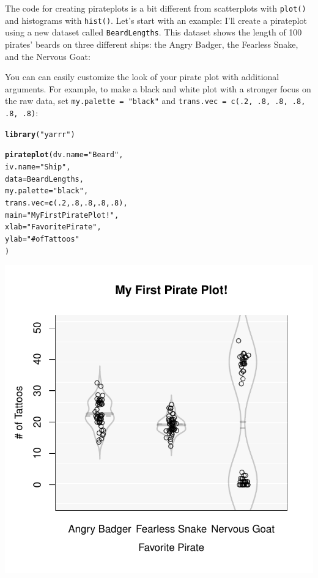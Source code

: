 \documentclass{tufte-book}\usepackage[]{graphicx}\usepackage[]{color}
\makeatletter
\def\maxwidth{ %
  \ifdim\Gin@nat@width>\linewidth
    \linewidth
  \else
    \Gin@nat@width
  \fi
}
\newcommand{\hlnum}[1]{\textcolor[rgb]{0.686,0.059,0.569}{#1}}%
\newcommand{\hlstr}[1]{\textcolor[rgb]{0.192,0.494,0.8}{#1}}%
\newcommand{\hlstd}[1]{\textcolor[rgb]{0.345,0.345,0.345}{#1}}%
\newcommand{\hlkwc}[1]{\textcolor[rgb]{0.333,0.667,0.333}{#1}}%
\newcommand{\hlkwd}[1]{\textcolor[rgb]{0.737,0.353,0.396}{\textbf{#1}}}%
\newenvironment{kframe}{%
 \def\at@end@of@kframe{}%
 \ifinner\ifhmode%
  \def\at@end@of@kframe{\end{minipage}}%
  \begin{minipage}{\columnwidth}%
 \fi\fi%
 \def\FrameCommand##1{\hskip\@totalleftmargin \hskip-\fboxsep
 \colorbox{shadecolor}{##1}\hskip-\fboxsep
     \hskip-\linewidth \hskip-\@totalleftmargin \hskip\columnwidth}%
 \MakeFramed {\advance\hsize-\width
   \@totalleftmargin\z@ \linewidth\hsize
   \@setminipage}}%
 {\par\unskip\endMakeFramed%
 \at@end@of@kframe}
\newenvironment{knitrout}{}{} %
\makeatother
\begin{document}
The code for creating pirateplots is a bit different from scatterplots with \texttt{plot()} and histograms with \texttt{hist()}. Let's start with an example: I'll create a pirateplot using a new dataset called \texttt{BeardLengths}. This dataset shows the length of 100 pirates' beards on three different ships: the Angry Badger, the Fearless Snake, and the Nervous Goat:

\begin{marginfigure}

You can can easily customize the look of your pirate plot with additional arguments. For example, to make a black and white plot with a stronger focus on the raw data, set \texttt{my.palette = "black"} and \texttt{trans.vec = c(.2, .8, .8, .8, .8, .8)}:

\begin{footnotesize}
\begin{knitrout}
\color{fgcolor}\begin{kframe}
\begin{alltt}
\hlkwd{library}\hlstd{(}\hlstr{"yarrr"}\hlstd{)}

\hlkwd{pirateplot}\hlstd{(}\hlkwc{dv.name} \hlstd{=} \hlstr{"Beard"}\hlstd{,}
           \hlkwc{iv.name} \hlstd{=} \hlstr{"Ship"}\hlstd{,}
         \hlkwc{data} \hlstd{= BeardLengths,}
         \hlkwc{my.palette} \hlstd{=} \hlstr{"black"}\hlstd{,}
         \hlkwc{trans.vec} \hlstd{=} \hlkwd{c}\hlstd{(}\hlnum{.2}\hlstd{,} \hlnum{.8}\hlstd{,} \hlnum{.8}\hlstd{,} \hlnum{.8}\hlstd{,} \hlnum{.8}\hlstd{),}
         \hlkwc{main} \hlstd{=} \hlstr{"My First Pirate Plot!"}\hlstd{,}
         \hlkwc{xlab} \hlstd{=} \hlstr{"Favorite Pirate"}\hlstd{,}
         \hlkwc{ylab} \hlstd{=} \hlstr{"# of Tattoos"}
         \hlstd{)}
\end{alltt}
\end{kframe}
\includegraphics[width=\maxwidth]{figure/unnamed-chunk-199-1} 


\end{knitrout}
\end{footnotesize}
\end{marginfigure}
\end{document}
